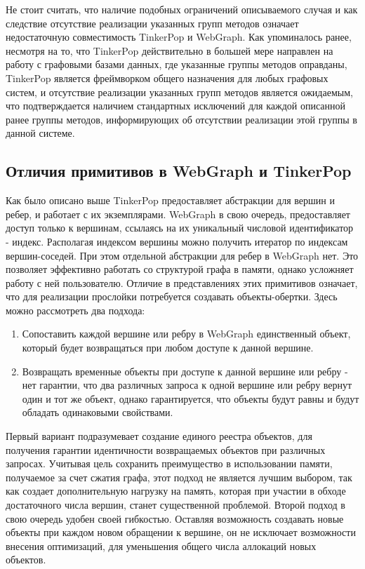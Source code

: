\documentclass[times,specification,annotation]{itmo-student-thesis}
\begin{document}
Не стоит считать, что наличие подобных ограничений описываемого случая и как следствие отсутствие реализации указанных групп методов означает недостаточную совместимость TinkerPop и WebGraph. Как упоминалось ранее, несмотря на то, что TinkerPop действительно в большей мере направлен на работу с графовыми базами данных, где указанные группы методов оправданы, TinkerPop является фреймворком общего назначения для любых графовых систем, и отсутствие реализации указанных групп методов является ожидаемым, что подтверждается наличием стандартных исключений для каждой описанной ранее группы методов, информирующих об отсутствии реализации этой группы в данной системе.

\subsection{Отличия примитивов в WebGraph и TinkerPop}

Как было описано выше TinkerPop предоставляет абстракции для вершин и ребер, и работает с их экземплярами. WebGraph в свою очередь, предоставляет доступ только к вершинам, ссылаясь на их уникальный числовой идентификатор - индекс. Располагая индексом вершины можно получить итератор по индексам вершин-соседей. При этом отдельной абстракции для ребер в WebGraph нет. Это позволяет эффективно работать со структурой графа в памяти, однако усложняет работу с ней пользователю. Отличие в представлениях этих примитивов означает, что для реализации прослойки потребуется создавать объекты-обертки. Здесь можно рассмотреть два подхода:
\begin{enumerate}
    \item Сопоставить каждой вершине или ребру в WebGraph единственный объект, который будет возвращаться при любом доступе к данной вершине.
    \item Возвращать временные объекты при доступе к данной вершине или ребру - нет гарантии, что два различных запроса к одной вершине или ребру вернут один и тот же объект, однако гарантируется, что объекты будут равны и будут обладать одинаковыми свойствами.
\end{enumerate}

Первый вариант подразумевает создание единого реестра объектов, для получения гарантии идентичности возвращаемых объектов при различных запросах. Учитывая цель сохранить преимущество в использовании памяти, получаемое за счет сжатия графа, этот подход не является лучшим выбором, так как создает дополнительную нагрузку на память, которая при участии в обходе достаточного числа вершин, станет существенной проблемой.
Второй подход в свою очередь удобен своей гибкостью. Оставляя возможность создавать новые объекты при каждом новом обращении к вершине, он не исключает возможности внесения оптимизаций, для уменьшения общего числа аллокаций новых объектов.
\end{document}
